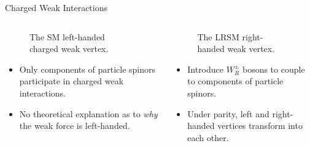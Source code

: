 \documentclass[aspectratio=169]{beamer}
\begin{document}
\begin{frame}{Charged Weak Interactions}
  \begin{columns}
    \begin{column}{0.5\textwidth}
      \begin{figure}
        \centering
        
        \caption{The SM left-handed charged weak vertex.}
      \end{figure}
      \begin{itemize}
        \item Only  components of 
          particle spinors participate in charged weak interactions.
        \item No theoretical explanation as to \emph{why} 
          the weak force is left-handed.
      \end{itemize}
    \end{column}
    \begin{column}{0.5\textwidth}
      \begin{figure}
        \centering
        
        \caption{The LRSM right-handed weak vertex.}
      \end{figure}
      \begin{itemize}
        \item Introduce $W_{R}^{\pm}$ bosons to couple to  components of 
        particle spinors.
        \item Under parity, left and right-handed vertices transform into each other.
      \end{itemize}
    \end{column}
  \end{columns}
\end{frame}
\end{document}
